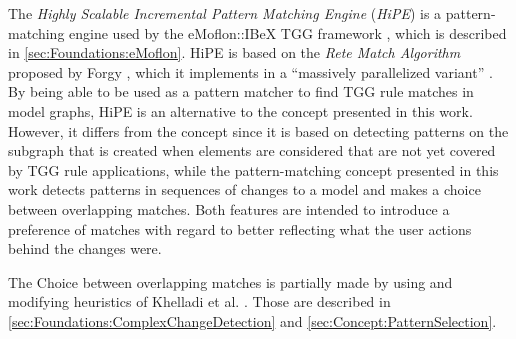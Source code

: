 The \emph{Highly Scalable Incremental Pattern Matching Engine} (\emph{HiPE}) \cite{hipe-devops_highly_2022} is a pattern-matching engine used by the eMoflon::IBeX TGG framework \cite{eMoflonIBeX_weidmann_incremental_nodate}, which is described in \autoref{sec:Foundations:eMoflon}.
HiPE is based on the \emph{Rete Match Algorithm} proposed by Forgy \cite{forgy_rete_1982}, which it implements in a \enquote{massively parallelized variant} \cite{kratz_model-driven_2025}.
By being able to be used as a pattern matcher to find TGG rule matches in model graphs, HiPE is an alternative to the concept presented in this work. However, it differs from the concept since it is based on detecting patterns on the subgraph that is created when elements are considered that are not yet covered by TGG rule applications, while the pattern-matching concept presented in this work detects patterns in sequences of changes to a model and makes a choice between overlapping matches.
Both features are intended to introduce a preference of matches with regard to better reflecting what the user actions behind the changes were.

The Choice between overlapping matches is partially made by using and modifying heuristics of Khelladi et al. \cite{khelladi_detecting_complex_changes_2015}. Those are described in \autoref{sec:Foundations:ComplexChangeDetection} and \autoref{sec:Concept:PatternSelection}.